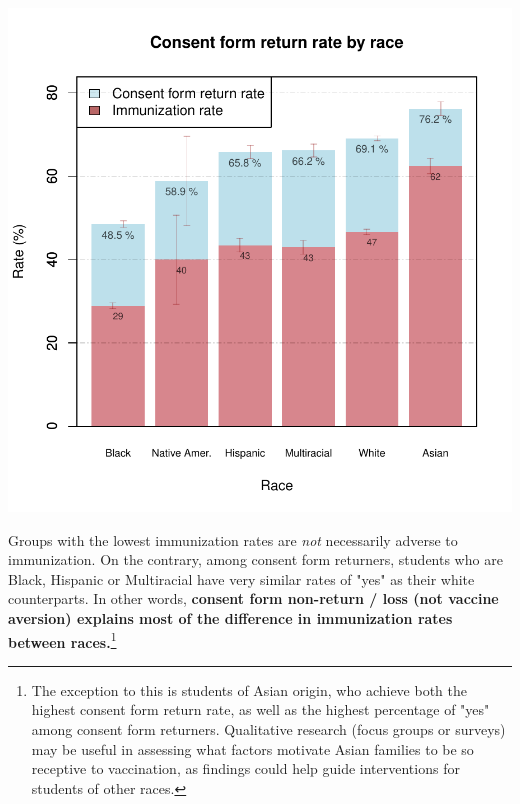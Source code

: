 \begin{multicols}{2}
\begin{center}
\includegraphics{targeting-004}
\end{center}

Groups with the lowest immunization rates are \emph{not} necessarily adverse to immunization.  On the contrary, among consent form returners, students who are Black, Hispanic or Multiracial have very similar rates of "yes" as their white counterparts.  In other words, \textbf{consent form non-return / loss (not vaccine aversion) explains most of the difference in immunization rates between races.}\footnote{The exception to this is students of Asian origin, who achieve both the highest consent form return rate, as well as the highest percentage of "yes" among consent form returners.  Qualitative research (focus groups or surveys) may be useful in assessing what factors motivate Asian families to be so receptive to vaccination, as findings could help guide interventions for students of other races.}


\end{multicols}
